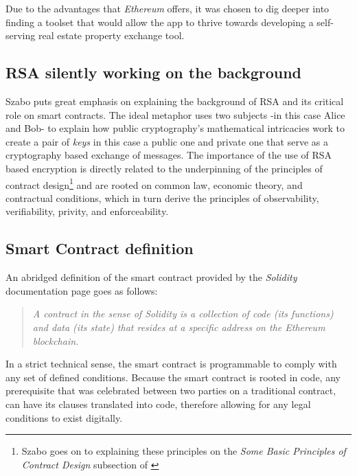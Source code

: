 \documentclass[submission,copyright,creativecommons]{eptcs}
\begin{document}
Due to the advantages that \textit{Ethereum} offers, it was chosen to dig deeper into finding a toolset that would allow the app to thrive towards developing a self-serving real estate property exchange tool.

\subsection{RSA silently working on the background}
Szabo puts great emphasis on explaining the background of RSA\cite{milanov2009rsa} and its critical role on smart contracts.  The ideal metaphor uses two subjects -in this case Alice and Bob- to explain how public cryptography's mathematical intricacies work to create a pair of \textit{keys} in this case a public one and private one that serve as a cryptography based exchange of messages.  The importance of the use of RSA based encryption is directly related to the underpinning of the principles of contract design\footnote{Szabo goes on to explaining these principles on the \textit{Some Basic Principles of Contract Design} subsection of \cite{NickSzaboSmart}} and are rooted on common law, economic theory, and contractual conditions, which in turn derive the principles of observability, verifiability, privity, and enforceability.

\subsection{Smart Contract definition}
An abridged definition of the smart contract provided by the \textit{Solidity} documentation page goes as follows:
\begin{quote}
    \textit{A contract in the sense of Solidity is a collection of code (its functions) and data (its state) that resides at a specific address on the Ethereum blockchain.\cite{IntroductionSmartContracts}}
\end{quote}
In a strict technical sense, the smart contract is programmable to comply with any set of defined conditions.  Because the smart contract is rooted in code, any prerequisite that was celebrated between two parties on a traditional contract, can have its clauses translated into code, therefore allowing for any legal conditions to exist digitally.
\end{document}
